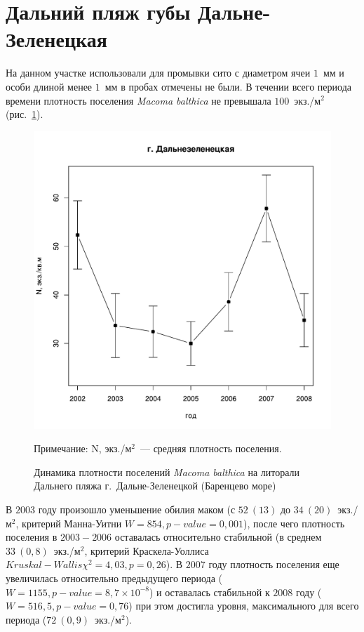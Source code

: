 		\section{Дальний пляж губы Дальне-Зеленецкая}
На данном участке использовали для промывки сито с диаметром ячеи $1$~мм и особи длиной менее $1$~мм в пробах отмечены не были. 
В течении всего периода времени плотность поселения {\it Macoma balthica} не превышала $100$~экз./м$^2$  (рис.~\ref{ris:dynamic_Zelency}). 
	\begin{figure}[p]
		\includegraphics{../Barenc_Sea/Dalnezeleneckaya/N_dynamic1.pdf}
	\caption{Динамика плотности поселений {\it Macoma balthica} на литорали Дальнего пляжа г.~Дальне-Зеленецкой (Баренцево море)}
{\footnotesize Примечание: N, экз./м$^2$~--- средняя плотность поселения.}
	\label{ris:dynamic_Zelency}
	\end{figure}

В $2003$ году произошло уменьшение обилия маком (с $52~(13)$ до $34~(20)$~экз./м$^2$, критерий Манна-Уитни  $W = 854, p-value = 0,001$), после чего плотность поселения  в $2003 - 2006$ оставалась относительно стабильной (в среднем $33~(0,8)$~экз./м$^2$, критерий Краскела-Уоллиса $Kruskal-Wallis \chi^2 = 4,03, p = 0,26$). 
В $2007$ году плотность поселения еще увеличилась относительно предыдущего периода ($W = 1155, p-value = 8,7 \times 10^{-8}$) и оставалась стабильной к $2008$ году ($W = 516,5, p-value = 0,76$) при этом достигла уровня, максимального для всего периода ($72~(0,9)$~экз./м$^2$).

